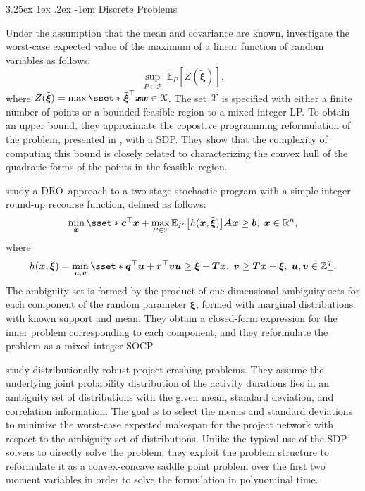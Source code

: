 \documentclass[final,onefignum,onetabnum]{class}
\makeatletter
\renewcommand\paragraph{\@startsection{paragraph}{4}{\z@}%
  {3.25ex \@plus1ex \@minus.2ex}%
  {-1em}%
  {\normalfont\normalsize\bfseries}}
\newcommand{\ee}[2]{\mathbb{E}_{#1} \left[ #2 \right]}
\newcommand{\bs}[1]{\boldsymbol{#1}} %
\newcommand{\Bs}[1]{\mathbb{#1}} %
\newcommand{\Cs}[1]{\mathcal{#1}} %
\newcommand{\txi}{\tilde{\bs{\xi}}}
\newcommand{\dro}{DRO}
\makeatother
\begin{document}
\paragraph{Discrete Problems}

Under the assumption that the mean and covariance are known, \citet{natarajan2017SDP} investigate  the worst-case expected value of the maximum of a linear function of random variables as follows:
\begin{equation*}
    \sup_{P \in \Cs{P}} \ \ee{P}{Z(\txi)},
\end{equation*}
where $Z(\txi)=\max\sset*{\txi^{\top}\bs{x}}{\bs{x} \in \Cs{X}}$. 
The set $\Cs{X}$ is specified with either a finite number of points or a bounded feasible region to a mixed-integer LP. To obtain an upper bound, they approximate the copostive programming reformulation of the problem, presented in \citet[Theorem~3.3]{natarajan2011mixed}, with a SDP.  They  show that the complexity of computing this bound is closely related to characterizing the convex hull of the quadratic forms of the points in the feasible region. 

\citet{xie2018integer} study a \dro\ approach to a two-stage stochastic program with a simple integer round-up recourse function, defined as follows:
\begin{equation*}
    \min_{\bs{x}}\sset*{\bs{c}^{\top}\bs{x} +\max_{P \in \Cs{P}} \ee{P}{h(\bs{x}, \txi)}}{\bs{A}\bs{x} \ge \bs{b}, \; \bs{x} \in \Bs{R}^{n}},
\end{equation*}
where 
\begin{equation*}
    h(\bs{x},\bs{\xi})=\min_{\bs{u},\bs{v}}\sset*{\bs{q}^{\top}\bs{u}+ \bs{r}^{\top}\bs{v}}{\bs{u} \ge \bs{\xi}-\bs{T} \bs{x}, \; \bs{v} \ge \bs{T} \bs{x} -\bs{\xi}, \; \bs{u}, \bs{v} \in \Bs{Z}_{+}^{q}}.
\end{equation*}
The ambiguity set is formed by the product of one-dimensional ambiguity sets for each component of the random parameter $\txi$, formed with marginal distributions with known support and mean. They obtain a closed-form expression for the inner problem corresponding to each component, and they reformulate the problem as a mixed-integer SOCP. 

\citet{ahipasaoglu2016distributionally} study distributionally robust project crashing problems. They assume the underlying joint probability distribution of the activity durations lies in an ambiguity set of distributions with the given mean, standard deviation, and correlation information. The goal is to  select  the means and standard deviations to minimize the worst-case expected makespan for the project network with respect to the ambiguity set of distributions. Unlike the typical use of the SDP solvers to directly solve the problem, they  exploit the problem structure to reformulate it as a convex-concave saddle point problem over the
first two moment variables in order to solve the formulation in  polynominal time. %
\end{document}
